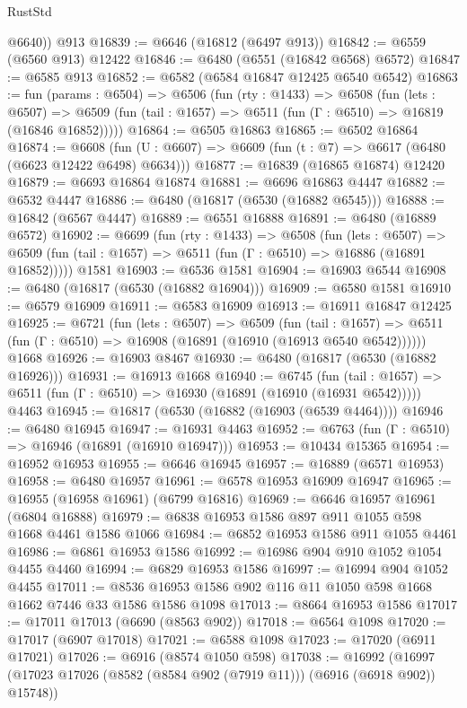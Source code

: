 \begin{lexlean}{RustStd}
\begin{coremodule}
        @6640))
    @913
@16839 := @6646 (@16812 (@6497 @913))
@16842 := @6559 (@6560 @913) @12422
@16846 := @6480 (@6551 (@16842 @6568) @6572)
@16847 := @6585 @913
@16852 := @6582 (@6584 @16847 @12425 @6540 @6542)
@16863 := fun (params : @6504) =>
  @6506
    (fun (rty : @1433) =>
    @6508
      (fun (lets : @6507) =>
      @6509 (fun (tail : @1657) => @6511 (fun (Γ : @6510) => @16819 (@16846 @16852)))))
@16864 := @6505 @16863
@16865 := @6502 @16864
@16874 := @6608
    (fun (U : @6607) => @6609 (fun (t : @7) => @6617 (@6480 (@6623 @12422 @6498) @6634)))
@16877 := @16839 (@16865 @16874) @12420
@16879 := @6693 @16864 @16874
@16881 := @6696 @16863 @4447
@16882 := @6532 @4447
@16886 := @6480 (@16817 (@6530 (@16882 @6545)))
@16888 := @16842 (@6567 @4447)
@16889 := @6551 @16888
@16891 := @6480 (@16889 @6572)
@16902 := @6699
    (fun (rty : @1433) =>
    @6508
      (fun (lets : @6507) =>
      @6509 (fun (tail : @1657) => @6511 (fun (Γ : @6510) => @16886 (@16891 @16852)))))
    @1581
@16903 := @6536 @1581
@16904 := @16903 @6544
@16908 := @6480 (@16817 (@6530 (@16882 @16904)))
@16909 := @6580 @1581
@16910 := @6579 @16909
@16911 := @6583 @16909
@16913 := @16911 @16847 @12425
@16925 := @6721
    (fun (lets : @6507) =>
    @6509
      (fun (tail : @1657) =>
      @6511 (fun (Γ : @6510) => @16908 (@16891 (@16910 (@16913 @6540 @6542))))))
    @1668
@16926 := @16903 @8467
@16930 := @6480 (@16817 (@6530 (@16882 @16926)))
@16931 := @16913 @1668
@16940 := @6745
    (fun (tail : @1657) => @6511 (fun (Γ : @6510) => @16930 (@16891 (@16910 (@16931 @6542)))))
    @4463
@16945 := @16817 (@6530 (@16882 (@16903 (@6539 @4464))))
@16946 := @6480 @16945
@16947 := @16931 @4463
@16952 := @6763 (fun (Γ : @6510) => @16946 (@16891 (@16910 @16947)))
@16953 := @10434 @15365
@16954 := @16952 @16953
@16955 := @6646 @16945
@16957 := @16889 (@6571 @16953)
@16958 := @6480 @16957
@16961 := @6578 @16953 @16909 @16947
@16965 := @16955 (@16958 @16961) (@6799 @16816)
@16969 := @6646 @16957 @16961 (@6804 @16888)
@16979 := @6838 @16953 @1586 @897 @911 @1055 @598 @1668 @4461 @1586 @1066
@16984 := @6852 @16953 @1586 @911 @1055 @4461
@16986 := @6861 @16953 @1586
@16992 := @16986 @904 @910 @1052 @1054 @4455 @4460
@16994 := @6829 @16953 @1586
@16997 := @16994 @904 @1052 @4455
@17011 := @8536 @16953 @1586 @902 @116 @11 @1050 @598 @1668 @1662 @7446 @33 @1586 @1586 @1098
@17013 := @8664 @16953 @1586
@17017 := @17011 @17013 (@6690 (@8563 @902))
@17018 := @6564 @1098
@17020 := @17017 (@6907 @17018)
@17021 := @6588 @1098
@17023 := @17020 (@6911 @17021)
@17026 := @6916 (@8574 @1050 @598)
@17038 := @16992
    (@16997 (@17023 @17026 (@8582 (@8584 @902 (@7919 @11))) (@6916 (@6918 @902)) @15748))

\end{coremodule}
\end{lexlean}
